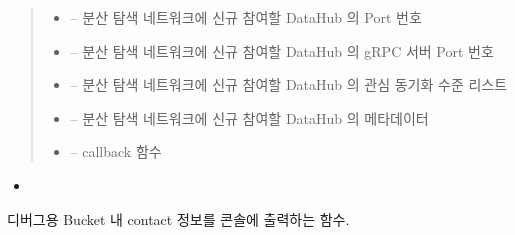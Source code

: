 \documentclass[a4paper,10pt,english]{sphinxmanual}
\begin{document}
\begin{fulllineitems}
\begin{fulllineitems}
\begin{quote}
\begin{description}
\begin{itemize}
\item {} 
\sphinxAtStartPar
{} – 분산 탐색 네트워크에 신규 참여할 DataHub 의 Port 번호

\item {} 
\sphinxAtStartPar
{} – 분산 탐색 네트워크에 신규 참여할 DataHub 의 {\hyperref[\detokenize{_SessionListener:sessionlistener}]{}} gRPC 서버 Port 번호

\item {} 
\sphinxAtStartPar
{} – 분산 탐색 네트워크에 신규 참여할 DataHub 의 관심 동기화 수준 리스트

\item {} 
\sphinxAtStartPar
{} – 분산 탐색 네트워크에 신규 참여할 DataHub 의 메타데이터

\item {} 
\sphinxAtStartPar
{} – callback 함수

\end{itemize}

\end{description}\end{quote}


\nopagebreak

\begin{itemize}
\item {} 
\sphinxAtStartPar
{\hyperref[\detokenize{_DHSearch:DHSearch._discoverProcess}]{}}

\end{itemize}



\end{fulllineitems}


\begin{fulllineitems}
\label{\detokenize{_kademlia:KNode.debug}}
\pysigstartsignatures
{}
\pysigstopsignatures
\sphinxAtStartPar
디버그용 Bucket 내 contact 정보를 콘솔에 출력하는 함수.

\end{fulllineitems}


\end{fulllineitems}
\end{document}
